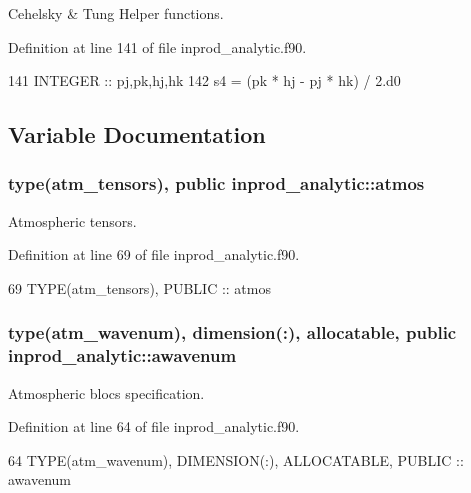 Cehelsky \& Tung Helper functions. 



Definition at line 141 of file inprod\+\_\+analytic.\+f90.


\begin{DoxyCode}
141     \textcolor{keywordtype}{INTEGER} :: pj,pk,hj,hk
142     s4 = (pk * hj - pj * hk) / 2.d0
\end{DoxyCode}


\subsection{Variable Documentation}
\subsubsection[{\texorpdfstring{atmos}{atmos}}]{\setlength{\rightskip}{0pt plus 5cm}type({\bf atm\+\_\+tensors}), public inprod\+\_\+analytic\+::atmos}\hypertarget{namespaceinprod__analytic_a6f4fe9aa292d78b871e5498e411d1297}{}\label{namespaceinprod__analytic_a6f4fe9aa292d78b871e5498e411d1297}


Atmospheric tensors. 



Definition at line 69 of file inprod\+\_\+analytic.\+f90.


\begin{DoxyCode}
69   \textcolor{keywordtype}{TYPE}(atm\_tensors), \textcolor{keywordtype}{PUBLIC} :: atmos 
\end{DoxyCode}
\subsubsection[{\texorpdfstring{awavenum}{awavenum}}]{\setlength{\rightskip}{0pt plus 5cm}type({\bf atm\+\_\+wavenum}), dimension(\+:), allocatable, public inprod\+\_\+analytic\+::awavenum}\hypertarget{namespaceinprod__analytic_aa6b6ebedac44495720ffe649bc937a56}{}\label{namespaceinprod__analytic_aa6b6ebedac44495720ffe649bc937a56}


Atmospheric blocs specification. 



Definition at line 64 of file inprod\+\_\+analytic.\+f90.


\begin{DoxyCode}
64   \textcolor{keywordtype}{TYPE}(atm\_wavenum), \textcolor{keywordtype}{DIMENSION(:)}, \textcolor{keywordtype}{ALLOCATABLE}, \textcolor{keywordtype}{PUBLIC} :: awavenum 
\end{DoxyCode}
